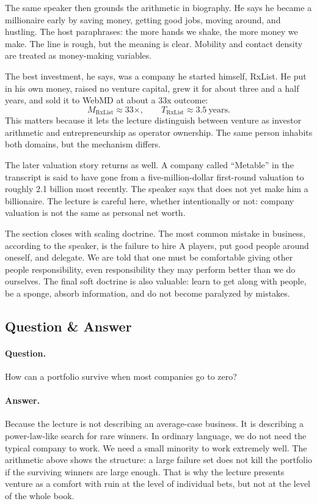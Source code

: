 The same speaker then grounds the arithmetic in biography. He says he became a millionaire early by saving money, getting good jobs, moving around, and hustling. The host paraphrases: the more hands we shake, the more money we make. The line is rough, but the meaning is clear. Mobility and contact density are treated as money-making variables.

The best investment, he says, was a company he started himself, RxList. He put in his own money, raised no venture capital, grew it for about three and a half years, and sold it to WebMD at about a 33x outcome:
\begin{equation}
M_{\text{RxList}} \approx 33\times,\qquad
T_{\text{RxList}} \approx 3.5\ \text{years}.
\end{equation}
This matters because it lets the lecture distinguish between venture as investor arithmetic and entrepreneurship as operator ownership. The same person inhabits both domains, but the mechanism differs.

The later valuation story returns as well. A company called ``Metable'' in the transcript is said to have gone from a five-million-dollar first-round valuation to roughly 2.1 billion most recently. The speaker says that does not yet make him a billionaire. The lecture is careful here, whether intentionally or not: company valuation is not the same as personal net worth.

The section closes with scaling doctrine. The most common mistake in business, according to the speaker, is the failure to hire A players, put good people around oneself, and delegate. We are told that one must be comfortable giving other people responsibility, even responsibility they may perform better than we do ourselves. The final soft doctrine is also valuable: learn to get along with people, be a sponge, absorb information, and do not become paralyzed by mistakes.

\subsection{Question \& Answer}

\paragraph{Question.} How can a portfolio survive when most companies go to zero?

\paragraph{Answer.} Because the lecture is not describing an average-case business. It is describing a power-law-like search for rare winners. In ordinary language, we do not need the typical company to work. We need a small minority to work extremely well. The arithmetic above shows the structure: a large failure set does not kill the portfolio if the surviving winners are large enough. That is why the lecture presents venture as a comfort with ruin at the level of individual bets, but not at the level of the whole book.

